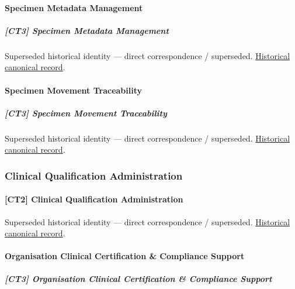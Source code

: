 \paragraph{Specimen Metadata Management}

\subparagraph{[CT3] Specimen Metadata Management}

\par\label{element:3b000d3712534d16a48470f79df8e33a}
Superseded historical identity — direct correspondence / superseded. \href{../../../../continuum/strategy/capability/3b000d3712534d16a48470f79df8e33a.md}{Historical canonical record}.\par

\paragraph{Specimen Movement Traceability}

\subparagraph{[CT3] Specimen Movement Traceability}

\par\label{element:129119d7b2744ffd805c58f25557fa27}
Superseded historical identity — direct correspondence / superseded. \href{../../../../continuum/strategy/capability/129119d7b2744ffd805c58f25557fa27.md}{Historical canonical record}.\par

\subsubsection{Clinical Qualification Administration}

\paragraph{[CT2] Clinical Qualification Administration}

\par\label{element:5fea7aaac4384245b1f08a3d8a076bd9}
Superseded historical identity — direct correspondence / superseded. \href{../../../../continuum/strategy/capability/5fea7aaac4384245b1f08a3d8a076bd9.md}{Historical canonical record}.\par

\paragraph{Organisation Clinical Certification \& Compliance Support}

\subparagraph{[CT3] Organisation Clinical Certification \& Compliance Support}

